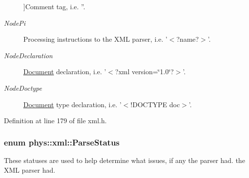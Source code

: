 \begin{Desc}
\begin{description}
{}]Comment tag, i.e. ''. \item[{\em 
\hypertarget{namespacephys_1_1xml_a668b0cc666a9d49f7c7222a7552115d3a3c09d11be0cea840f23f55e084cf72fa}{
NodePi}
\label{d9/d27/namespacephys_1_1xml_a668b0cc666a9d49f7c7222a7552115d3a3c09d11be0cea840f23f55e084cf72fa}
}]Processing instructions to the XML parser, i.e. '$<$?name?$>$'. \item[{\em 
\hypertarget{namespacephys_1_1xml_a668b0cc666a9d49f7c7222a7552115d3a1e3789aa995b7bf563ca8c43553ac035}{
NodeDeclaration}
\label{d9/d27/namespacephys_1_1xml_a668b0cc666a9d49f7c7222a7552115d3a1e3789aa995b7bf563ca8c43553ac035}
}]\hyperlink{classphys_1_1xml_1_1Document}{Document} declaration, i.e. '$<$?xml version=\char`\"{}1.0\char`\"{}?$>$'. \item[{\em 
\hypertarget{namespacephys_1_1xml_a668b0cc666a9d49f7c7222a7552115d3a079e78516a732a77616552ddaebd7883}{
NodeDoctype}
\label{d9/d27/namespacephys_1_1xml_a668b0cc666a9d49f7c7222a7552115d3a079e78516a732a77616552ddaebd7883}
}]\hyperlink{classphys_1_1xml_1_1Document}{Document} type declaration, i.e. '$<$!DOCTYPE doc$>$'. \end{description}
\end{Desc}



Definition at line 179 of file xml.h.

\hypertarget{namespacephys_1_1xml_ae7aabb879b21c73d8183a54470f8917f}{
\subsubsection[{ParseStatus}]{\setlength{\rightskip}{0pt plus 5cm}enum {\bf phys::xml::ParseStatus}}}
\label{d9/d27/namespacephys_1_1xml_ae7aabb879b21c73d8183a54470f8917f}


These statuses are used to help determine what issues, if any the parser had. the XML parser had. 

